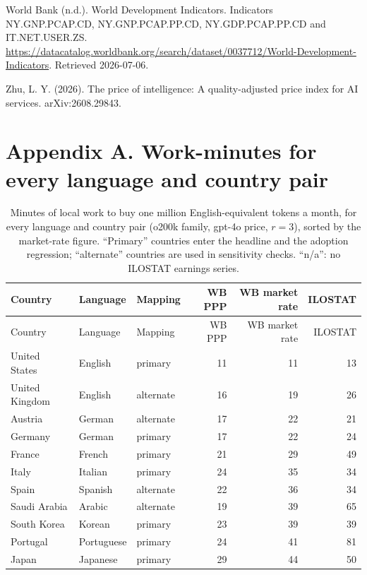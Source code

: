 \documentclass[11pt]{article}
\begin{document}
World Bank (n.d.). World Development Indicators. Indicators NY.GNP.PCAP.CD, NY.GNP.PCAP.PP.CD, NY.GDP.PCAP.PP.CD and IT.NET.USER.ZS. \url{https://datacatalog.worldbank.org/search/dataset/0037712/World-Development-Indicators}. Retrieved 2026-07-06.

Zhu, L. Y. (2026). The price of intelligence: A quality-adjusted price index for AI services. arXiv:2608.29843.

\endgroup
\clearpage
\setcounter{table}{0}

\section{Appendix A. Work-minutes for every language and country pair}

\begin{longtable}[]{@{}lllrrr@{}}
\caption{Minutes of local work to buy one million English-equivalent tokens a month, for every language and country pair (o200k family, gpt-4o price, \(r = 3\)), sorted by the market-rate figure. ``Primary'' countries enter the headline and the adoption regression; ``alternate'' countries are used in sensitivity checks. ``n/a'': no ILOSTAT earnings series.}\tabularnewline
\toprule\noalign{}
Country & Language & Mapping & WB PPP & WB market rate & ILOSTAT \\
\midrule\noalign{}
\endfirsthead
\toprule\noalign{}
Country & Language & Mapping & WB PPP & WB market rate & ILOSTAT \\
\midrule\noalign{}
\endhead
\bottomrule\noalign{}
\endlastfoot
United States & English & primary & 11 & 11 & 13 \\
United Kingdom & English & alternate & 16 & 19 & 26 \\
Austria & German & alternate & 17 & 22 & 21 \\
Germany & German & primary & 17 & 22 & 24 \\
France & French & primary & 21 & 29 & 49 \\
Italy & Italian & primary & 24 & 35 & 34 \\
Spain & Spanish & alternate & 22 & 36 & 34 \\
Saudi Arabia & Arabic & alternate & 19 & 39 & 65 \\
South Korea & Korean & primary & 23 & 39 & 39 \\
Portugal & Portuguese & primary & 24 & 41 & 81 \\
Japan & Japanese & primary & 29 & 44 & 50 \\

\end{longtable}
\end{document}
